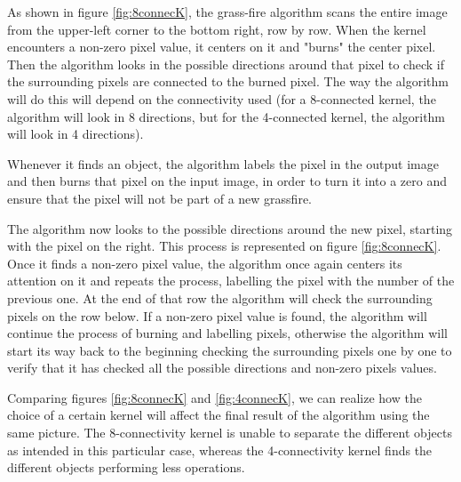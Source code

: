 As shown in figure \ref{fig:8connecK}, the grass-fire algorithm scans the entire image from the upper-left corner to the bottom right, row by row. When the kernel encounters a non-zero pixel value, it centers on it and "burns" the center pixel. Then the algorithm looks in the possible directions around that pixel to check if the surrounding pixels are connected to the burned pixel. The way the algorithm will do this will depend on the connectivity used (for a 8-connected kernel, the algorithm will look in 8 directions, but for the 4-connected kernel, the algorithm will look in 4 directions).

Whenever it finds an object, the algorithm labels the pixel in the output image and then burns that pixel on the input image, in order to turn it into a zero and ensure that the pixel will not be part of a new grassfire.

The algorithm now looks to the possible directions around the new pixel, starting with the pixel on the right. This process is represented on figure \ref{fig:8connecK}. Once it finds a non-zero pixel value, the algorithm once again centers its attention on it and repeats the process, labelling the pixel with the number of the previous one. At the end of that row the algorithm will check the surrounding pixels on the row below. If a non-zero pixel value is found, the algorithm will continue the process of burning and labelling pixels, otherwise the algorithm will start its way back to the beginning checking the surrounding pixels one by one to verify that it has checked all the possible directions and non-zero pixels values.

Comparing figures \ref{fig:8connecK} and \ref{fig:4connecK}, we can realize how the choice of a certain kernel will affect the final result of the algorithm using the same picture. The 8-connectivity kernel is unable to separate the different objects as intended in this particular case, whereas the 4-connectivity kernel finds the different objects performing less operations.

